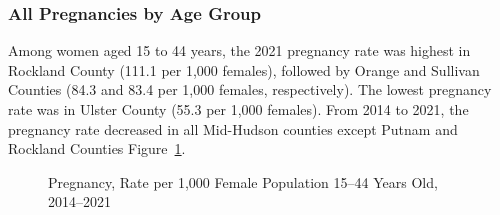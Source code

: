 \documentclass[
  english,
  letterpaper,
]{report}
\begin{document}
\subsubsection{All Pregnancies by Age
Group}\label{all-pregnancies-by-age-group}

Among women aged 15 to 44 years, the 2021 pregnancy rate was highest in
Rockland County (111.1 per 1,000 females), followed by Orange and
Sullivan Counties (84.3 and 83.4 per 1,000 females, respectively). The
lowest pregnancy rate was in Ulster County (55.3 per 1,000 females).
From 2014 to 2021, the pregnancy rate decreased in all Mid-Hudson
counties except Putnam and Rockland Counties
Figure~\ref{fig-15to44-preg-rate}.

\begin{figure}


\caption{\label{fig-15to44-preg-rate}Pregnancy, Rate per 1,000 Female
Population 15--44 Years Old, 2014--2021}

\end{figure}%
\end{document}
